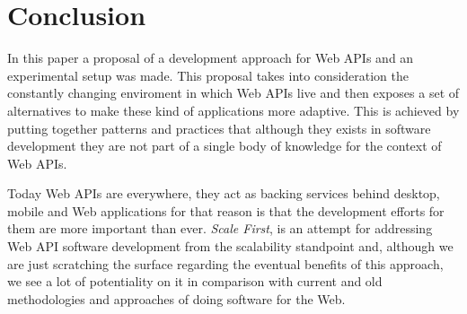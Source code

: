 \documentclass[10pt,article]{IEEEtran}
\begin{document}




\section{Conclusion}
In this paper a proposal of a development approach for Web APIs and an experimental setup was made. This proposal takes into consideration the constantly changing enviroment in which Web APIs live and then exposes a set of alternatives to make these kind of applications more adaptive. This is achieved by putting together patterns and practices that although they exists in software development they are not part of a single body of knowledge for the context of Web APIs.

Today Web APIs are everywhere, they act as backing services behind desktop, mobile and Web applications for that reason is that the development efforts for them are more important than ever.  \textit{Scale First}, is an attempt for addressing Web API software development from the scalability standpoint and, although we are just scratching the surface regarding the eventual benefits of this approach, we see a lot of potentiality on it in comparison with current and old methodologies and approaches of doing software for the Web.





%
\end{document}
